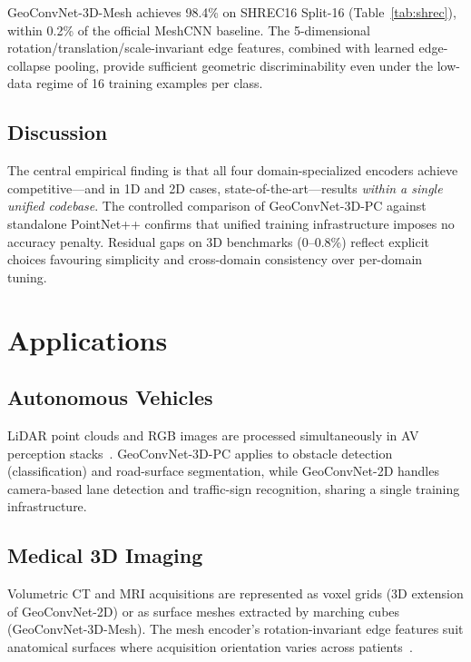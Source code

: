 \documentclass[10pt,conference]{IEEEtran}
\begin{document}
GeoConvNet-3D-Mesh achieves 98.4\% on SHREC16 Split-16
(Table~\ref{tab:shrec}), within 0.2\% of the official MeshCNN baseline.
The 5-dimensional rotation/translation/scale-invariant edge features, combined
with learned edge-collapse pooling, provide sufficient geometric
discriminability even under the low-data regime of 16 training examples per
class.

\subsection{Discussion}

The central empirical finding is that all four domain-specialized encoders
achieve competitive---and in 1D and 2D cases, state-of-the-art---results
\emph{within a single unified codebase}. The controlled comparison of
GeoConvNet-3D-PC against standalone PointNet++ confirms that unified
training infrastructure imposes no accuracy penalty. Residual gaps on 3D
benchmarks (0--0.8\%) reflect explicit choices favouring simplicity and
cross-domain consistency over per-domain tuning.

\section{Applications}
\label{sec:applications}

\subsection{Autonomous Vehicles}

LiDAR point clouds and RGB images are processed simultaneously in AV
perception stacks~\cite{li2020deep}. GeoConvNet-3D-PC applies to obstacle
detection (classification) and road-surface segmentation, while
GeoConvNet-2D handles camera-based lane detection and traffic-sign
recognition, sharing a single training infrastructure.

\subsection{Medical 3D Imaging}

Volumetric CT and MRI acquisitions are represented as voxel grids (3D
extension of GeoConvNet-2D) or as surface meshes extracted by marching
cubes (GeoConvNet-3D-Mesh). The mesh encoder's rotation-invariant edge
features suit anatomical surfaces where acquisition orientation varies
across patients~\cite{litjens2017survey}.
\end{document}
